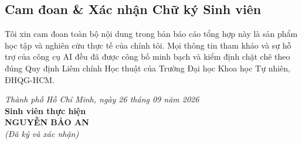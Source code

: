 \documentclass[11pt,a4paper]{article}
\begin{document}
\subsection{Cam đoan \& Xác nhận Chữ ký Sinh viên}
Tôi xin cam đoan toàn bộ nội dung trong bản báo cáo tổng hợp này là sản phẩm học tập và nghiên cứu thực tế của chính tôi. Mọi thông tin tham khảo và sự hỗ trợ của công cụ AI đều đã được công bố minh bạch và kiểm định chặt chẽ theo đúng Quy định Liêm chính Học thuật của Trường Đại học Khoa học Tự nhiên, ĐHQG-HCM.

\vspace{10mm}
\begin{flushright}
\begin{minipage}{0.45\textwidth}
\centering
\textit{Thành phố Hồ Chí Minh, ngày 26 tháng 09 năm 2026}\\
\textbf{Sinh viên thực hiện}\\[15mm]
\textbf{NGUYỄN BẢO AN}\\
\textit{(Đã ký và xác nhận)}
\end{minipage}
\end{flushright}
\end{document}
